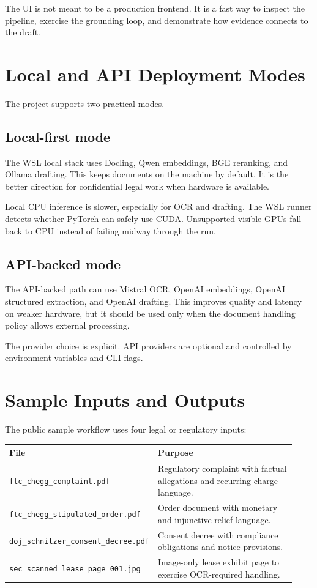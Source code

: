 \documentclass[11pt]{article}
\newcommand{\code}[1]{\texttt{#1}}
\begin{document}
The UI is not meant to be a production frontend. It is a fast way to inspect the pipeline, exercise the grounding loop, and demonstrate how evidence connects to the draft.

\section{Local and API Deployment Modes}

The project supports two practical modes.

\subsection{Local-first mode}

The WSL local stack uses Docling, Qwen embeddings, BGE reranking, and Ollama drafting. This keeps documents on the machine by default. It is the better direction for confidential legal work when hardware is available.

Local CPU inference is slower, especially for OCR and drafting. The WSL runner detects whether PyTorch can safely use CUDA. Unsupported visible GPUs fall back to CPU instead of failing midway through the run.

\subsection{API-backed mode}

The API-backed path can use Mistral OCR, OpenAI embeddings, OpenAI structured extraction, and OpenAI drafting. This improves quality and latency on weaker hardware, but it should be used only when the document handling policy allows external processing.

The provider choice is explicit. API providers are optional and controlled by environment variables and CLI flags.

\section{Sample Inputs and Outputs}

The public sample workflow uses four legal or regulatory inputs:

\begin{longtable}{>{\raggedright\arraybackslash}p{0.44\linewidth} >{\raggedright\arraybackslash}p{0.49\linewidth}}
\toprule
\textbf{File} & \textbf{Purpose} \\
\midrule
\code{ftc\_chegg\_complaint.pdf} & Regulatory complaint with factual allegations and recurring-charge language. \\
\code{ftc\_chegg\_stipulated\_order.pdf} & Order document with monetary and injunctive relief language. \\
\code{doj\_schnitzer\_consent\_decree.pdf} & Consent decree with compliance obligations and notice provisions. \\
\code{sec\_scanned\_lease\_page\_001.jpg} & Image-only lease exhibit page to exercise OCR-required handling. \\
\bottomrule
\end{longtable}
\end{document}
